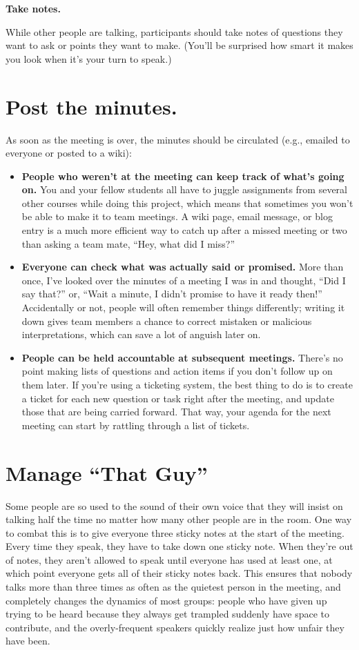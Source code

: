 \documentclass[10pt,letterpaper]{article}
\newcommand{\rulemajor}[1]{\section{#1}}
\begin{document}
\textbf{Take notes.}

While other people are talking, participants should take notes of questions they
want to ask or points they want to make.  (You'll be surprised how smart it
makes you look when it's your turn to speak.)

\rulemajor{Post the minutes.}

As soon as the meeting is over, the minutes should be circulated (e.g., emailed
to everyone or posted to a wiki):

\begin{itemize}

\item
  \textbf{People who weren't at the meeting can keep track of what's going on.}
  You and your fellow students all have to juggle assignments from several other
  courses while doing this project, which means that sometimes you won't be able
  to make it to team meetings.  A wiki page, email message, or blog entry is a
  much more efficient way to catch up after a missed meeting or two than asking
  a team mate, ``Hey, what did I miss?''

\item
  \textbf{Everyone can check what was actually said or promised.} More than
  once, I've looked over the minutes of a meeting I was in and thought, ``Did I
  say that?'' or, ``Wait a minute, I didn't promise to have it ready then!''
  Accidentally or not, people will often remember things differently; writing it
  down gives team members a chance to correct mistaken or malicious
  interpretations, which can save a lot of anguish later on.

\item
  \textbf{People can be held accountable at subsequent meetings.} There's no
  point making lists of questions and action items if you don't follow up on
  them later.  If you're using a ticketing system, the best thing to do is to
  create a ticket for each new question or task right after the meeting, and
  update those that are being carried forward.  That way, your agenda for the
  next meeting can start by rattling through a list of tickets.

\end{itemize}
  
\rulemajor{Manage ``That Guy''}

Some people are so used to the sound of their own voice that they will insist on
talking half the time no matter how many other people are in the room. One way
to combat this is to give everyone three sticky notes at the start of the
meeting. Every time they speak, they have to take down one sticky note. When
they're out of notes, they aren't allowed to speak until everyone has used at
least one, at which point everyone gets all of their sticky notes back. This
ensures that nobody talks more than three times as often as the quietest person
in the meeting, and completely changes the dynamics of most groups: people who
have given up trying to be heard because they always get trampled suddenly have
space to contribute, and the overly-frequent speakers quickly realize just how
unfair they have been.
\end{document}
